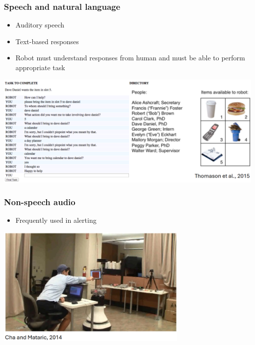 \documentclass[10pt]{article}
\begin{document}
\subsubsection*{Speech and natural language}
\begin{itemize}
	\item Auditory speech
	\item Text-based responses
	\item Robot must understand responses from human and must be able to perform appropriate task
\end{itemize}
\begin{center} 
	\includegraphics*[width=\textwidth]{L1_7.png} 
\end{center}

\subsubsection*{Non-speech audio}
\begin{itemize}
	\item Frequently used in alerting
\end{itemize}
\begin{center} 
	\includegraphics*[width=0.7\textwidth]{L1_8.png} 
\end{center}
\end{document}
